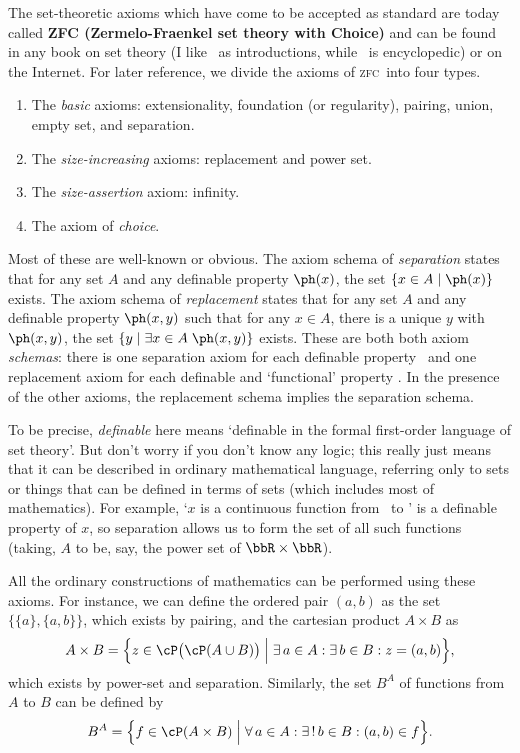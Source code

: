 \documentclass[12pt]{amsart}
\def\zfc{\textsc{zfc}}
\begin{document}
The set-theoretic axioms which have come to be accepted as standard
are today called \textbf{ZFC (Zermelo-Fraenkel set theory with
  Choice)} and can be found in any book on set theory (I
like~\cite{devlin:joy-of-sets,enderton:set-theory} as introductions,
while~\cite{jech:set-theory} is encyclopedic) or on the Internet.  For
later reference, we divide the axioms of \zfc\ into four types.
\begin{enumerate}
\item The \emph{basic} axioms: extensionality, foundation (or
  regularity), pairing, union, empty set, and separation.
\item The \emph{size-increasing} axioms: replacement and power set.
\item The \emph{size-assertion} axiom: infinity.
\item The axiom of \emph{choice}.
\end{enumerate}
Most of these are well-known or obvious.  The axiom schema of
\emph{separation} states that for any set $A$ and any definable
property $\ph(x)$, the set $\{x\in A \mid \ph(x)\}$ exists.  The axiom
schema of \emph{replacement} states that for any set $A$ and any
definable property $\ph(x,y)$ such that for any $x\in A$, there is a
unique $y$ with $\ph(x,y)$, the set $\{y\mid \exists x\in
A\;\ph(x,y)\}$ exists.  These are both both axiom \emph{schemas}:
there is one separation axiom for each definable property \ph\ and one
replacement axiom for each definable and `functional' property \ph.
In the presence of the other axioms, the replacement schema implies
the separation schema.

To be precise, \emph{definable} here means `definable in the formal
first-order language of set theory'.  But don't worry if you don't
know any logic; this really just means that it can be described in
ordinary mathematical language, referring only to sets or things that
can be defined in terms of sets (which includes most of mathematics).
For example, `$x$ is a continuous function from \bbR\ to \bbR' is a
definable property of $x$, so separation allows us to form the set of
all such functions (taking, $A$ to be, say, the power set of
$\bbR\times\bbR$).

All the ordinary constructions of mathematics can be performed using
these axioms.  For instance, we can define the ordered pair $(a,b)$ as
the set $\{\{a\}, \{a,b\}\}$, which exists by pairing, and
the cartesian product $A\times B$ as
\[A\times B = \Big\{ z \in \cP\big(\cP(A\cup B)\big) \;\Big|\;
\exists \,a\in A : \exists\, b\in B : z = (a,b)
\Big\},
\]
which exists by power-set and separation.  Similarly, the set $B^A$ of
functions from $A$ to $B$ can be defined by
\[B^A = \Big\{ f \in \cP(A\times B) \;\Big|\;
\forall\, a\in A: \exists\,!\, b\in B : (a,b)\in f
\Big\}.
\]
\end{document}
